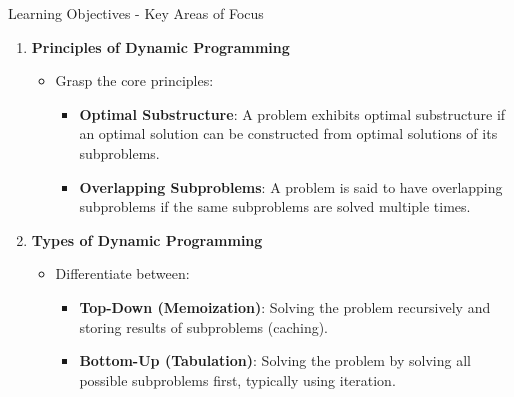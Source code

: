 \documentclass[aspectratio=169]{beamer}
\begin{document}
\begin{frame}[fragile]{Learning Objectives - Key Areas of Focus}
    \begin{enumerate}
        \item \textbf{Principles of Dynamic Programming}
            \begin{itemize}
                \item Grasp the core principles:
                    \begin{itemize}
                        \item \textbf{Optimal Substructure}:
                        A problem exhibits optimal substructure if an optimal solution can be constructed from optimal solutions of its subproblems.
                        
                        \item \textbf{Overlapping Subproblems}:
                        A problem is said to have overlapping subproblems if the same subproblems are solved multiple times.
                    \end{itemize}
            \end{itemize}

        \item \textbf{Types of Dynamic Programming}
            \begin{itemize}
                \item Differentiate between:
                    \begin{itemize}
                        \item \textbf{Top-Down (Memoization)}: Solving the problem recursively and storing results of subproblems (caching).
                        \item \textbf{Bottom-Up (Tabulation)}: Solving the problem by solving all possible subproblems first, typically using iteration.
                    \end{itemize}
            \end{itemize}
    \end{enumerate}
\end{frame}
\end{document}

